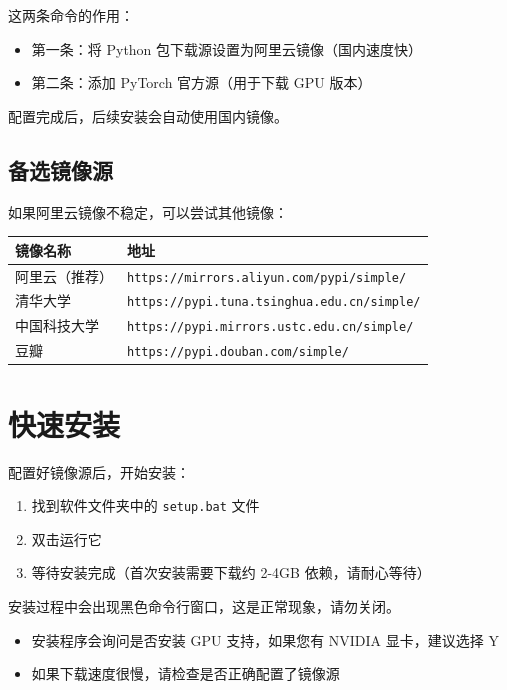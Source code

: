 \documentclass[UTF8,zihao=-4,openany]{ctexbook}
\begin{document}
\begin{TipBox}
	这两条命令的作用：
	\begin{itemize}
		\item 第一条：将 Python 包下载源设置为阿里云镜像（国内速度快）
		\item 第二条：添加 PyTorch 官方源（用于下载 GPU 版本）
	\end{itemize}
	配置完成后，后续安装会自动使用国内镜像。
\end{TipBox}

\subsection{备选镜像源}

如果阿里云镜像不稳定，可以尝试其他镜像：

\begin{center}
	\begin{tabular}{ll}
		\toprule
		\textbf{镜像名称} & \textbf{地址}                                        \\
		\midrule
		阿里云（推荐）       & \texttt{https://mirrors.aliyun.com/pypi/simple/}   \\
		清华大学          & \texttt{https://pypi.tuna.tsinghua.edu.cn/simple/} \\
		中国科技大学        & \texttt{https://pypi.mirrors.ustc.edu.cn/simple/}  \\
		豆瓣            & \texttt{https://pypi.douban.com/simple/}           \\
		\bottomrule
	\end{tabular}
\end{center}

\section{快速安装}

配置好镜像源后，开始安装：

\begin{enumerate}
	\item 找到软件文件夹中的 \texttt{setup.bat} 文件
	\item 双击运行它
	\item 等待安装完成（首次安装需要下载约 2-4GB 依赖，请耐心等待）
\end{enumerate}

\begin{TipBox}
	安装过程中会出现黑色命令行窗口，这是正常现象，请勿关闭。
	\begin{itemize}
		\item 安装程序会询问是否安装 GPU 支持，如果您有 NVIDIA 显卡，建议选择 Y
		\item 如果下载速度很慢，请检查是否正确配置了镜像源
	\end{itemize}
\end{TipBox}
\end{document}
